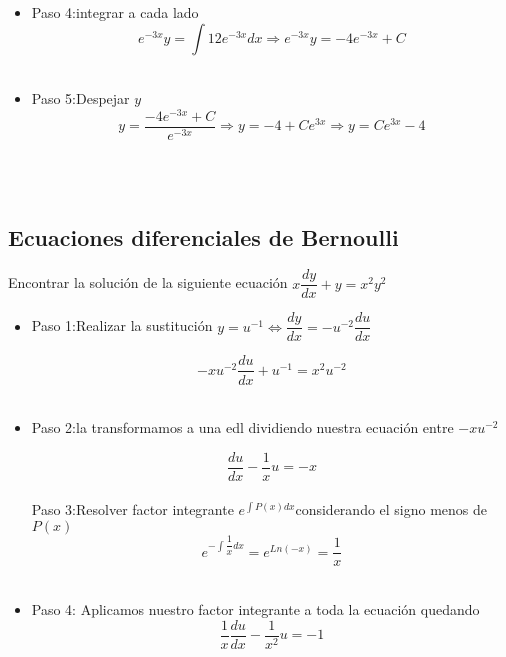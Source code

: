 \documentclass[10pt,a4paper]{article}
\begin{document}
{{{{{{{{{{{{\begin{itemize}
\begin{equation*}
\dfrac{d}{dx}[e ^{-3x}y]=e ^{-3x}12 \Rightarrow \dfrac{d}{dx}e ^{-3x}y=12e^{-3x}
\end{equation*}
\,\\
\item Paso 4:integrar a cada lado
\begin{equation*}
e ^{-3x}y=\int 12e ^{-3x}dx\Rightarrow e ^{-3x}y=-4e^{-3x}+C
\end{equation*}
\,\\
\item Paso 5:Despejar $y$
\begin{equation*}
y=\dfrac{-4e ^{-3x}+C}{e ^{-3x}}\Rightarrow y=-4+Ce ^{3x}\Rightarrow y=Ce ^{3x}-4
\end{equation*}
\,\\
\end{itemize}
\,\\
\subsection{Ecuaciones diferenciales de Bernoulli}
Encontrar  la solución de la siguiente ecuación $x\dfrac{dy}{dx}+y=x ^{2}y ^2$
\begin{itemize}
\item Paso 1:Realizar la sustitución $y=u ^{-1} \Leftrightarrow \dfrac{dy}{dx}=-u ^{-2}\dfrac{du}{dx}$

\begin{equation*}
-xu ^{-2}\dfrac{du}{dx}+u ^{-1}=x ^{2}u ^{-2}
\end{equation*}
\,\\

\item Paso 2:la transformamos a una edl dividiendo nuestra ecuación entre $-xu ^{-2}$

\begin{equation}\tag{ecuación diferencial lineal}
\dfrac{du}{dx}-\dfrac{1}{x}u=-x
\end{equation}
\,\\ Paso 3:Resolver factor integrante $e ^{\int P(x)dx}$considerando el signo menos de $P(x)$
\begin{equation*}
e ^{-\int{\dfrac{1}{x}}dx}=e^{Ln(-x)}=\dfrac{1}{x}
\end{equation*}
\,\\
\item Paso 4: Aplicamos nuestro factor integrante a toda la ecuación quedando 
\begin{equation*}
\dfrac{1}{x}\dfrac{du}{dx}-\dfrac{1}{x ^2}u=-1
\end{equation*}
\,\\


\end{itemize}}}}}}}}}}}}}
\end{document}
